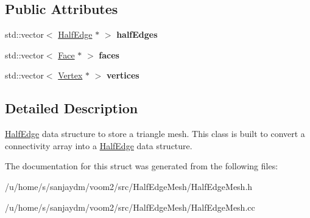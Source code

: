\subsection*{Public Attributes}
\begin{DoxyCompactItemize}
\item 
\hypertarget{structvoom_1_1_half_edge_mesh_a9c3212ff4158e8360b00373cf952e54e}{
std::vector$<$ \hyperlink{structvoom_1_1_half_edge}{HalfEdge} $\ast$ $>$ {\bfseries halfEdges}}
\label{structvoom_1_1_half_edge_mesh_a9c3212ff4158e8360b00373cf952e54e}

\item 
\hypertarget{structvoom_1_1_half_edge_mesh_afb358e2280d947af731fac89bb4ab6a7}{
std::vector$<$ \hyperlink{structvoom_1_1_face}{Face} $\ast$ $>$ {\bfseries faces}}
\label{structvoom_1_1_half_edge_mesh_afb358e2280d947af731fac89bb4ab6a7}

\item 
\hypertarget{structvoom_1_1_half_edge_mesh_aa3917972301fdcc70fe7ed6d8657134d}{
std::vector$<$ \hyperlink{structvoom_1_1_vertex}{Vertex} $\ast$ $>$ {\bfseries vertices}}
\label{structvoom_1_1_half_edge_mesh_aa3917972301fdcc70fe7ed6d8657134d}

\end{DoxyCompactItemize}


\subsection{Detailed Description}
\hyperlink{structvoom_1_1_half_edge}{HalfEdge} data structure to store a triangle mesh. This class is built to convert a connectivity array into a \hyperlink{structvoom_1_1_half_edge}{HalfEdge} data structure. 

The documentation for this struct was generated from the following files:\begin{DoxyCompactItemize}
\item 
/u/home/s/sanjaydm/voom2/src/HalfEdgeMesh/HalfEdgeMesh.h\item 
/u/home/s/sanjaydm/voom2/src/HalfEdgeMesh/HalfEdgeMesh.cc\end{DoxyCompactItemize}
